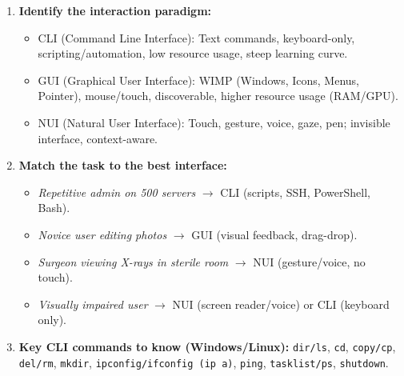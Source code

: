 \documentclass[11pt]{article}
\newcommand{\cle}[1]{{\popxbold\color{popdark}#1}}
\begin{document}
\begin{methode}
\begin{enumerate}
\item \textbf{Identify the interaction paradigm:}
\begin{itemize}
    \item \cle{CLI (Command Line Interface)}: Text commands, keyboard-only, scripting/automation, low resource usage, steep learning curve.
    \item \cle{GUI (Graphical User Interface)}: WIMP (Windows, Icons, Menus, Pointer), mouse/touch, discoverable, higher resource usage (RAM/GPU).
    \item \cle{NUI (Natural User Interface)}: Touch, gesture, voice, gaze, pen; invisible interface, context-aware.
\end{itemize}
\item \textbf{Match the task to the best interface:}
\begin{itemize}
    \item \emph{Repetitive admin on 500 servers} $\rightarrow$ CLI (scripts, SSH, PowerShell, Bash).
    \item \emph{Novice user editing photos} $\rightarrow$ GUI (visual feedback, drag-drop).
    \item \emph{Surgeon viewing X-rays in sterile room} $\rightarrow$ NUI (gesture/voice, no touch).
    \item \emph{Visually impaired user} $\rightarrow$ NUI (screen reader/voice) or CLI (keyboard only).
\end{itemize}
\item \textbf{Key CLI commands to know (Windows/Linux):} \texttt{dir/ls}, \texttt{cd}, \texttt{copy/cp}, \texttt{del/rm}, \texttt{mkdir}, \texttt{ipconfig/ifconfig (ip a)}, \texttt{ping}, \texttt{tasklist/ps}, \texttt{shutdown}.
\end{enumerate}
\end{methode}
\end{document}
